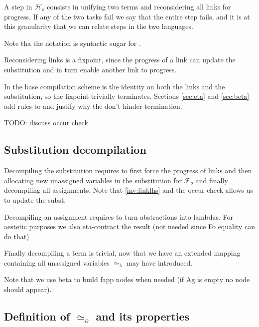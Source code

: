 \documentclass[sigconf,natbib=false,review]{acmart}
\newcommand{\UnifRel}{\ensuremath{\simeq}}
\newcommand{\Uo}{\ensuremath{\UnifRel_o}\xspace}
\newcommand{\Ue}{\ensuremath{\UnifRel_\lambda}\xspace}
\newcommand{\Fo}{\ensuremath{\mathcal{F}_{\!o}\xspace}} %
\newcommand{\Ho}{\ensuremath{\mathcal{H}_o}\xspace}
\begin{document}
A step in \Ho consists in unifying two terms and reconsidering all
links for progress. If any of the two tasks fail we say that the entire step
fails, and it is at this granularity that we can relate steps in the
two languages.




\noindent
Note tha the notation \elpiIn{((A ~\Ue~B) C D)} is syntactic sugar for
\elpiIn{((~\Ue~) A B C D)}.

Reconsidering links is a fixpoint, since the progress of a link can update the
substitution and in turn enable another link to progress.



\noindent
In the base compilation scheme  is the identity
on both the links and the substitution, so the fixpoint trivially terminates.
Sections \ref{sec:eta} and \ref{sec:beta} add rules to 
and justify why the don't hinder termination.

TODO: discuss occur check

\subsection{Substitution decompilation}

Decompiling the substitution requires to first force the
progress of links and then allocating new unassigned variables
in the substitution for \Fo{} and finally decompiling all
assignments. Note that \ref{inv:linklhs} and the
occur check allows us to update the subst.




\noindent
Decompiling an assignment requires to turn abstractions into
lambdas. For aestetic purposes we also eta-contract the result
(not needed since Fo equality can do that)



\noindent
Finally decompiling a term is trivial, now that we have an extended
mapping containing all unassigned variables \Ue may have introduced.



\noindent
Note that we use beta to build fapp nodes when needed (if Ag is empty
no  node should appear).

\subsection{Definition of \Uo and its properties}
\end{document}
